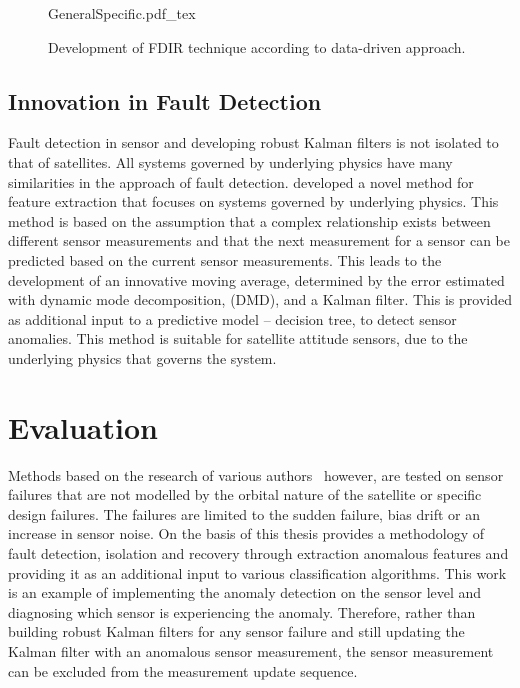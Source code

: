 \begin{figure}[h!t!b]
	\centering
	\def\svgwidth{14cm}
	{GeneralSpecific.pdf_tex}
	\caption{Development of FDIR technique according to data-driven approach.}
	\label{fig:GeneralSpecific}
\end{figure}

\subsection{Innovation in Fault Detection}
Fault detection in sensor and developing robust Kalman filters is not isolated to that of satellites. All systems governed by underlying physics have many similarities in the approach of fault detection. \cite{DeSilva2020} developed a novel method for feature extraction that focuses on systems governed by underlying physics. This method is based on the assumption that a complex relationship exists between different sensor measurements and that the next measurement for a sensor can be predicted based on the current sensor measurements. This leads to the development of an innovative moving average, determined by the error estimated with dynamic mode decomposition, (DMD), and a Kalman filter. This is provided as additional input to a predictive model -- decision tree, to detect sensor anomalies. This method is suitable for satellite attitude sensors, due to the underlying physics that governs the system.

\section{Evaluation}
Methods based on the research of various authors~\cite{wang2019adaptive,Xiong2007,Zhou2016,Nasrolahi2018,carvajal2017agent, van2012sensor} however, are tested on sensor failures that are not modelled by the orbital nature of the satellite or specific design failures. The failures are limited to the sudden failure, bias drift or an increase in sensor noise. On the basis of \cite{DeSilva2020} this thesis provides a methodology of fault detection, isolation and recovery through extraction anomalous features and providing it as an additional input to various classification algorithms. This work is an example of implementing the anomaly detection on the sensor level and diagnosing which sensor is experiencing the anomaly. Therefore, rather than building robust Kalman filters for any sensor failure and still updating the Kalman filter with an anomalous sensor measurement, the sensor measurement can be excluded from the measurement update sequence. 

